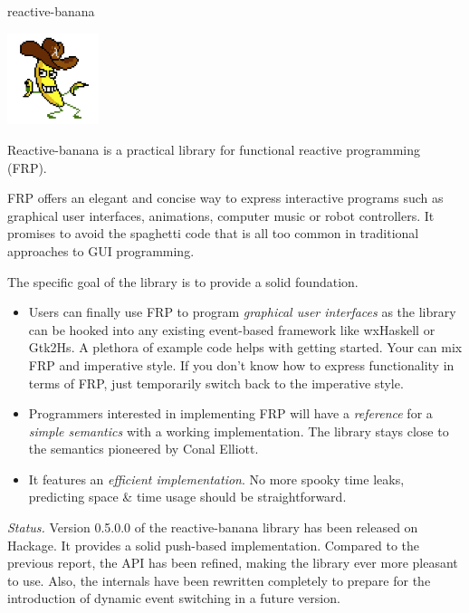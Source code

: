 \begin{hcarentry}[updated]{reactive-banana}
\makeheader

\begin{center}
\includegraphics[width=0.2\textwidth]{html/banana.jpg}
\end{center}

Reactive-banana is a practical library for functional reactive programming (FRP).

FRP offers an elegant and concise way to express interactive programs such as graphical user interfaces, animations, computer music or robot controllers. It promises to avoid the spaghetti code that is all too common in traditional approaches to GUI programming.

The specific goal of the library is to provide a solid foundation.
\begin{itemize}
\item Users can finally use FRP to program \emph{graphical user interfaces} as the library can be hooked into any existing event-based framework like wxHaskell or Gtk2Hs. A plethora of example code helps with getting started. Your can mix FRP and imperative style. If you don't know how to express functionality in terms of FRP, just temporarily switch back to the imperative style.
\item Programmers interested in implementing FRP will have a \emph{reference} for a \emph{simple semantics} with a working implementation. The library stays close to the semantics pioneered by Conal Elliott.
\item It features an \emph{efficient implementation}. No more spooky time leaks, predicting space \& time usage should be straightforward.
\end{itemize}

\emph{Status.} Version 0.5.0.0 of the reactive-banana library has been released on Hackage. It provides a solid push-based implementation. Compared to the previous report, the API has been refined, making the library ever more pleasant to use. Also, the internals have been rewritten completely to prepare for the introduction of dynamic event switching in a future version.


\end{hcarentry}
